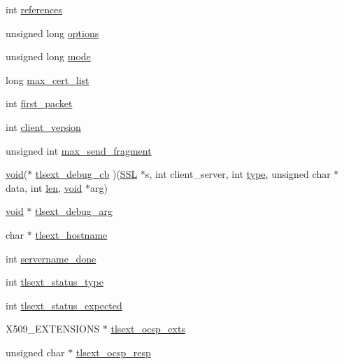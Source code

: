 \begin{DoxyCompactItemize}
\item 
int \hyperlink{structssl__st_a146fdb34d9a909e530adf8b189481195}{references}
\item 
unsigned long \hyperlink{structssl__st_aa6e0a0e8b728c3cc137ba2dfac41f277}{options}
\item 
unsigned long \hyperlink{structssl__st_ae78fbaec9753aee588d055aef59a801c}{mode}
\item 
long \hyperlink{structssl__st_aff3458de3fb94545236802c4042dc051}{max\+\_\+cert\+\_\+list}
\item 
int \hyperlink{structssl__st_ad32fcbc2b36297743a11face122ec053}{first\+\_\+packet}
\item 
int \hyperlink{structssl__st_addfcf5d7fdf014c692daa76a5b816c37}{client\+\_\+version}
\item 
unsigned int \hyperlink{structssl__st_a15c488cf6f57671d97ad93153fdc5965}{max\+\_\+send\+\_\+fragment}
\item 
\hyperlink{hw__4758__cca_8h_afad4d591c7931ff6dc5bf69c76c96aa0}{void}($\ast$ \hyperlink{structssl__st_a22554490bacd588c43bedf120c0d9db9}{tlsext\+\_\+debug\+\_\+cb} )(\hyperlink{crypto_2ossl__typ_8h_a71f21e09bf365489dab9d85bd4785e24}{S\+SL} $\ast$s, int client\+\_\+server, int \hyperlink{structssl__st_ac765329451135abec74c45e1897abf26}{type}, unsigned char $\ast$data, int \hyperlink{include_2openssl_2x509_8h_ad8c3db4434e9cb5cd772cc009f40e856}{len}, \hyperlink{hw__4758__cca_8h_afad4d591c7931ff6dc5bf69c76c96aa0}{void} $\ast$arg)
\item 
\hyperlink{hw__4758__cca_8h_afad4d591c7931ff6dc5bf69c76c96aa0}{void} $\ast$ \hyperlink{structssl__st_acb9ea3544d4a127584b2f96921f22f2e}{tlsext\+\_\+debug\+\_\+arg}
\item 
char $\ast$ \hyperlink{structssl__st_a322c71ead6960d65c1bc64bd96e1a78c}{tlsext\+\_\+hostname}
\item 
int \hyperlink{structssl__st_a3a5989c95102c3166c09e1fd4a0d1805}{servername\+\_\+done}
\item 
int \hyperlink{structssl__st_a981150d76650d75fe7f86c78b13a77b5}{tlsext\+\_\+status\+\_\+type}
\item 
int \hyperlink{structssl__st_a347ff47b970daa8671cbf686b3abdb5c}{tlsext\+\_\+status\+\_\+expected}
\item 
X509\+\_\+\+E\+X\+T\+E\+N\+S\+I\+O\+NS $\ast$ \hyperlink{structssl__st_ae5f42d44ee95f29c3a04b8f54561e488}{tlsext\+\_\+ocsp\+\_\+exts}
\item 
unsigned char $\ast$ \hyperlink{structssl__st_a3b89eb0047a380869844f83411a243eb}{tlsext\+\_\+ocsp\+\_\+resp}

\end{DoxyCompactItemize}
